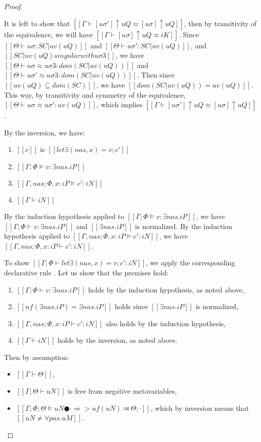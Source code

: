 \begin{proof}
\begin{caseof}
\begin{itemize}
            It is left to show that $[[Γ ⊢ [uσ']↑uQ ≈ [uσ]↑uQ]]$, 
            then by transitivity of the equivalence, we will have $[[Γ ⊢ [uσ]↑uQ ≈ iK]]$.
            Since $[[Θ ⊢ uσ : SC|uv(uQ)]]$ and $[[Θ ⊢ uσ' : SC|uv(uQ)]]$, 
            and $[[SC|uv(uQ) singular with uσ3]]$, we have 
            $[[Θ ⊢ uσ ≈ uσ3 : dom(SC|uv(uQ))]]$
            and $[[Θ ⊢ uσ' ≈ uσ3 : dom(SC|uv(uQ))]]$.
            Then since $[[uv(uQ) ⊆ dom(SC)]]$, we have $[[dom(SC|uv(uQ)) = uv(uQ)]]$.
            This way, by transitivity and symmetry of the equivalence, 
            $[[Θ ⊢ uσ ≈ uσ' : uv(uQ)]]$, which implies
            $[[Γ ⊢ [uσ']↑uQ ≈ [uσ]↑uQ]]$. 
        \end{itemize}

        \item {}
        By the inversion, we have:
        \begin{enumerate}
            \item $[[c]]$ is $[[let∃ (nas, x) = v; c']]$
            \item $[[Γ; Φ ⊨ v : ∃nas.iP]]$
            \item $[[Γ, nas ; Φ, x:iP ⊨ c' : iN]]$
            \item $[[Γ ⊢ iN]]$
        \end{enumerate}

        By the induction hypothesis applied to 
        $[[Γ; Φ ⊨ v : ∃nas.iP]]$, we have $[[Γ; Φ ⊢ v : ∃nas.iP]]$
        and $[[∃nas.iP]]$ is normalized.
        By the induction hypothesis applied to
        $[[Γ, nas ; Φ, x:iP ⊨ c' : iN]]$, we have $[[Γ, nas ; Φ, x:iP ⊢ c' : iN]]$.

        To show $[[Γ; Φ ⊢ let∃ (nas, x) = v; c' : iN]]$, we apply the corresponding
        declarative rule . Let us show that the premises hold:
        \begin{enumerate}
            \item $[[Γ ; Φ ⊢ v : ∃nas.iP]]$ holds by the induction hypothesis, as noted above,
            \item $[[nf(∃nas.iP) = ∃nas.iP]]$ holds since $[[∃nas.iP]]$ is normalized,
            \item $[[Γ, nas ; Φ, x:iP ⊢ c' : iN]]$ also holds by the induction hypothesis,
            \item $[[Γ ⊢ iN]]$ holds by the inversion, as noted above.
        \end{enumerate}

        \item {}
        Then by assumption:
        \begin{itemize}
            \item $[[Γ ⊢ Θ]]$,
            \item $[[Γ; Θ ⊢ uN]]$ is free from negative metavariables,
            \item $[[Γ; Φ; Θ ⊨ uN ● · ⇒> nf(uN) ⫤ Θ; ·]]$, which by inversion means that $[[uN ≠ ∀pas.uM]]$.
        \end{itemize}


\end{caseof}
\end{proof}
